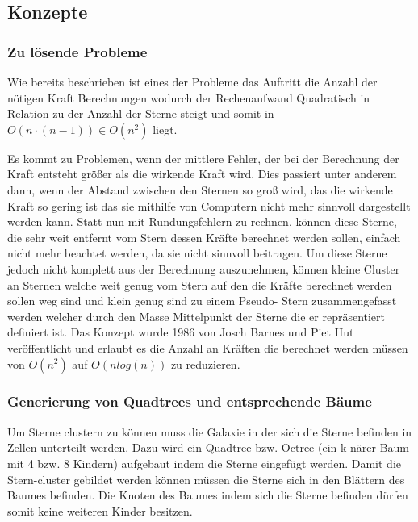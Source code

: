 \subsection{Konzepte}

\subsubsection{Zu lösende Probleme}
Wie bereits beschrieben ist eines der Probleme das Auftritt die Anzahl der
nötigen Kraft Berechnungen wodurch der Rechenaufwand Quadratisch in Relation zu
der Anzahl der Sterne steigt und somit in \( O(n \cdot (n - 1)) \in O(n^2) \)
liegt.

\par Es kommt zu Problemen, wenn der mittlere Fehler, der bei der Berechnung
der Kraft entsteht größer als die wirkende Kraft wird. Dies passiert unter
anderem dann, wenn der Abstand zwischen den Sternen so groß wird, das die
wirkende Kraft so gering ist das sie mithilfe von Computern nicht mehr sinnvoll
dargestellt werden kann.  Statt nun mit Rundungsfehlern zu rechnen, können
diese Sterne, die sehr weit entfernt vom Stern dessen Kräfte berechnet werden
sollen, einfach nicht mehr beachtet werden, da sie nicht sinnvoll beitragen. Um
diese Sterne jedoch nicht komplett aus der Berechnung auszunehmen, können
kleine Cluster an Sternen welche weit genug vom Stern auf den die Kräfte
berechnet werden sollen weg sind und klein genug sind zu einem Pseudo- Stern
zusammengefasst werden welcher durch den Masse Mittelpunkt der Sterne die er
repräsentiert definiert ist. Das Konzept wurde 1986 von Josch Barnes und Piet Hut
veröffentlicht \cite{barneshut86} und erlaubt es die Anzahl an Kräften die berechnet werden müssen
von \( O(n^2) \) auf \( O(n log(n)) \) zu reduzieren.

\subsubsection{Generierung von Quadtrees und entsprechende Bäume}

Um Sterne clustern zu können muss die Galaxie in der sich die Sterne befinden
in Zellen unterteilt werden. Dazu wird ein Quadtree bzw. Octree (ein k-närer
Baum mit 4 bzw. 8 Kindern) aufgebaut indem die Sterne eingefügt werden. Damit
die Stern-cluster gebildet werden können müssen die Sterne sich in den Blättern
des Baumes befinden. Die Knoten des Baumes indem sich die Sterne befinden
dürfen somit keine weiteren Kinder besitzen.

